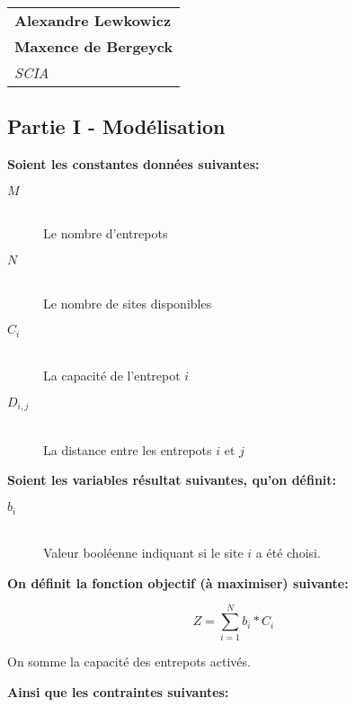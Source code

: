 \documentclass[a4paper]{article}
\begin{document}

\null\hfill\begin{tabular}[t]{l@{}}
  \textbf{Alexandre Lewkowicz} \\
  \textbf{Maxence de Bergeyck} \\
  \textit{SCIA}
\end{tabular}

\vspace{1cm}

\noindent{}

\vspace{1cm}


\subsection*{Partie I - Modélisation}

\textbf{Soient les constantes données suivantes:}

\begin{description}
    \item[$M$] \hfill \\
        Le nombre d'entrepots
    \item[$N$] \hfill \\
        Le nombre de sites disponibles
    \item[$C_{i}$] \hfill \\
        La capacité de l'entrepot $i$
    \item[$D_{i, j}$] \hfill \\
        La distance entre les entrepots $i$ et $j$
\end{description}

\textbf{Soient les variables résultat suivantes, qu'on définit:}

\begin{description}
    \item[$b_{i}$] \hfill \\
        Valeur booléenne indiquant si le site $i$ a été choisi.
\end{description}

\textbf{On définit la fonction objectif (à maximiser) suivante:}

$$
Z = \sum\limits_{i = 1}^{N}b_{i} * C_{i}
$$

On somme la capacité des entrepots activés.

\textbf{Ainsi que les contraintes suivantes:}
\end{document}
